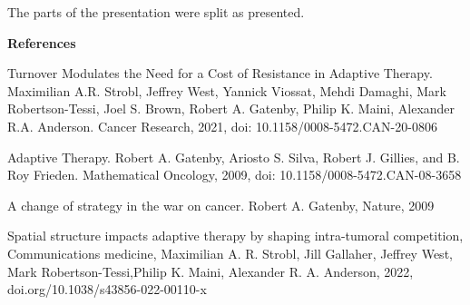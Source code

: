 \documentclass[11pt,a4paper]{article}
\begin{document}
The parts of the presentation were split as presented.
\vspace{10mm}

\textbf{References}

\vspace{1.5mm}

Turnover Modulates the Need for a Cost of Resistance in
Adaptive Therapy. Maximilian A.R. Strobl, Jeffrey West, Yannick Viossat, Mehdi Damaghi, Mark Robertson-Tessi,
Joel S. Brown, Robert A. Gatenby, Philip K. Maini, Alexander R.A. Anderson. Cancer Research, 2021, doi: 10.1158/0008-5472.CAN-20-0806

\vspace{2mm}

Adaptive Therapy. Robert A. Gatenby,
Ariosto S. Silva,
Robert J. Gillies,
and B. Roy Frieden. Mathematical Oncology, 2009, doi: 10.1158/0008-5472.CAN-08-3658
 
 \vspace{2mm}

 A change of strategy in the war on cancer. Robert A. Gatenby, Nature, 2009
 
 \vspace{2mm}

Spatial structure impacts adaptive therapy by
shaping intra-tumoral competition, Communications 
medicine, Maximilian A. R. Strobl, Jill Gallaher, 
Jeffrey West, Mark Robertson-Tessi,Philip K. Maini,
Alexander R. A. Anderson, 2022,
doi.org/10.1038/s43856-022-00110-x
\end{document}

